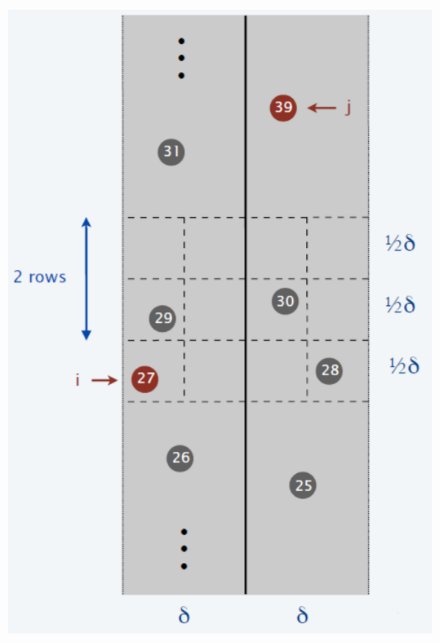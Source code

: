 \documentclass[11pt]{article}
\begin{document}
\begin{figure}[h]
	\centering
	\includegraphics[scale=0.7]{p3}
\end{figure}
\end{document}
